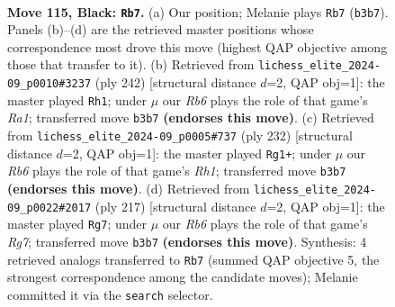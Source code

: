 \documentclass[11pt]{article}
\begin{document}
\clearpage

\begin{figure}[p]\centering
\begin{subfigure}{0.46\textwidth}\centering
\resizebox{\linewidth}{!}{%
\newchessgame
\chessboard[
  setfen={7r/8/8/8/4k3/1r6/5K2/8 b - - 5 115},
  showmover=false,
  pgfstyle=straightmove, color=movearrow, markmove={b3-b7}
]}
\caption{}
\end{subfigure}\hfill
\begin{subfigure}{0.46\textwidth}\centering
\resizebox{\linewidth}{!}{%
\newchessgame
\chessboard[
  setfen={8/8/2K5/8/1k6/8/4r3/R7 w - - 66 122},
  showmover=false,
  pgfstyle=straightmove, color=movearrow, markmove={a1-h1}
]}
\caption{}
\end{subfigure}
\\[4pt]
\begin{subfigure}{0.46\textwidth}\centering
\resizebox{\linewidth}{!}{%
\newchessgame
\chessboard[
  setfen={6k1/4K3/8/8/8/r7/8/7R w - - 62 117},
  showmover=false,
  pgfstyle=straightmove, color=movearrow, markmove={h1-g1}
]}
\caption{}
\end{subfigure}\hfill
\begin{subfigure}{0.46\textwidth}\centering
\resizebox{\linewidth}{!}{%
\newchessgame
\chessboard[
  setfen={5R2/8/8/8/8/4K3/6r1/2k5 b - - 54 109},
  showmover=false,
  pgfstyle=straightmove, color=movearrow, markmove={g2-g7}
]}
\caption{}
\end{subfigure}
\caption{\textbf{Move 115, Black: \texttt{Rb7}.} (a) Our position; Melanie plays \texttt{Rb7} (\texttt{b3b7}). Panels (b)--(d) are the retrieved master positions whose correspondence most drove this move (highest QAP objective among those that transfer to it). (b) Retrieved from \texttt{lichess\_elite\_2024-09\_p0010\#3237} (ply 242) [structural distance $d$=2, QAP obj=1]: the master played \texttt{Rh1}; under $\mu$ our \emph{Rb6} plays the role of that game's \emph{Ra1}; transferred move \texttt{b3b7} \textbf{(endorses this move)}. (c) Retrieved from \texttt{lichess\_elite\_2024-09\_p0005\#737} (ply 232) [structural distance $d$=2, QAP obj=1]: the master played \texttt{Rg1+}; under $\mu$ our \emph{Rb6} plays the role of that game's \emph{Rh1}; transferred move \texttt{b3b7} \textbf{(endorses this move)}. (d) Retrieved from \texttt{lichess\_elite\_2024-09\_p0022\#2017} (ply 217) [structural distance $d$=2, QAP obj=1]: the master played \texttt{Rg7}; under $\mu$ our \emph{Rb6} plays the role of that game's \emph{Rg7}; transferred move \texttt{b3b7} \textbf{(endorses this move)}. Synthesis: 4 retrieved analogs transferred to \texttt{Rb7} (summed QAP objective 5, the strongest correspondence among the candidate moves); Melanie committed it via the \texttt{search} selector.}
\label{fig:thought-m229}
\end{figure}
\end{document}
